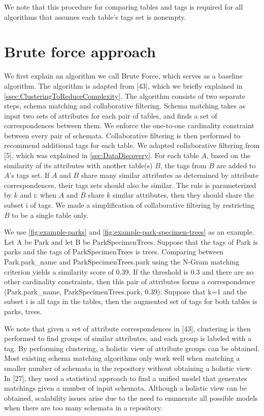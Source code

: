 We note that this procedure for comparing tables and tags is required for all algorithms that assumes each table\textquoteright s tags set is nonempty.

\section{Brute force approach}
\label{sec:BruteForceApproach}

We first explain an algorithm we call Brute Force, which serves as a baseline algorithm. The algorithm is adapted from \cite{Smith2011Unity}[43], which we briefly explained in \autoref{ssec:ClusteringToReduceComplexity}. The algorithm consists of two separate steps, schema matching and collaborative filtering. Schema matching takes as input two sets of attributes for each pair of tables, and finds a set of correspondences between them. We enforce the one-to-one cardinality constraint between every pair of schemata. Collaborative filtering is then performed to recommend additional tags for each table. We adapted collaborative filtering from \cite{conf/esws/EllefiBDT16}[5], which was explained in \autoref{sec:DataDiscovery}. For each table $A$, based on the similarity of its attributes with another table(s) $B$, the tags from $B$ are added to $A$'s tags set. If $A$ and $B$ share many similar attributes as determined by attribute correspondences, their tags sets should also be similar. The rule is parameterized by $k$ and i: when $A$ and $B$ share $k$ similar attributes, then they should share the subset i of tags. We made a simplification of collaborative filtering by restricting $B$ to be a single table only.

We use \autoref{fig:example-parks} and \autoref{fig:example-park-specimen-trees} as an example. Let A be Park and let B be ParkSpecimenTrees. Suppose that the tags of Park is {parks} and the tags of ParkSpecimenTrees is {trees}. Comparing between Park.park\_name and ParkSpecimenTrees.park using the N-Gram matching criterion yields a similarity score of 0.39. If the threshold is 0.3 and there are no other cardinality constraints, then this pair of attributes forms a correspondence (Park.park\_name, ParkSpecimenTrees.park, 0.39). Suppose that k=1 and the subset i is all tags in the tables, then the augmented set of tags for both tables is {parks, trees}.

We note that given a set of attribute correspondences in \cite{Smith2011Unity}[43], clustering is then performed to find groups of similar attributes, and each group is labeled with a tag. By performing clustering, a holistic view of attribute groups can be obtained. Most existing schema matching algorithms only work well when matching a smaller number of schemata in the repository without obtaining a holistic view. In \cite{10.1145/2396761.2398468}[27], they used a statistical approach to find a unified model that generates matchings given a number of input schemata. Although a holistic view can be obtained, scalability issues arise due to the need to enumerate all possible models when there are too many schemata in a repository.

